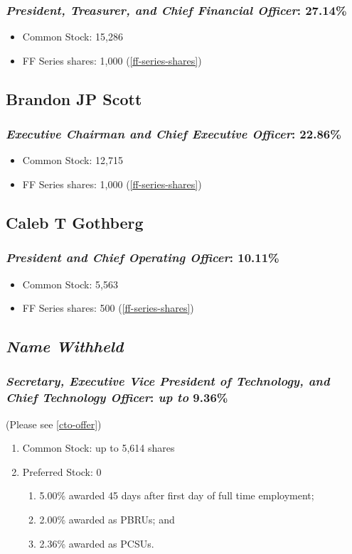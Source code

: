 \documentclass[11pt]{report}
\begin{document}
	\subsubsection{\textit{President, Treasurer, and Chief Financial Officer}: \textbf{27.14\%}}
	\begin{itemize}
		\item Common Stock: 15,286
		\item FF Series shares: 1,000 (\ref{ff-series-shares})
	\end{itemize}
\subsection{Brandon JP Scott}
	\subsubsection{\textit{Executive Chairman and Chief Executive Officer}: \textbf{22.86\%}}
	\begin{itemize}
		\item Common Stock: 12,715
		\item FF Series shares: 1,000 (\ref{ff-series-shares})
	\end{itemize}
\subsection{Caleb T Gothberg}
	\subsubsection{\textit{President and Chief Operating Officer}: \textbf{10.11\%}}
	\begin{itemize}
		\item Common Stock: 5,563
		\item FF Series shares: 500 (\ref{ff-series-shares})
	\end{itemize}
\subsection{\emph{Name Withheld}}
	\subsubsection{\textit{Secretary, Executive Vice President of Technology, and Chief Technology Officer}: \emph{up to} \textbf{9.36\%}} (Please see \ref{cto-offer})
	\begin{enumerate}
		\item Common Stock: up to 5,614 shares
		\item Preferred Stock: 0
		\begin{enumerate}
			\item 5.00\% awarded 45 days after first day of full time employment;
			\item 2.00\% awarded as PBRUs; and
			\item 2.36\% awarded as PCSUs.
		\end{enumerate}
	\end{enumerate}
\end{document}
